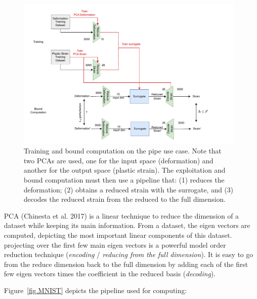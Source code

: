 \begin{figure}[h!]
    \centering
    \includegraphics[scale=0.9]{PIPE.pdf} \hspace{1.5cm}
    \caption{Training and bound computation on the pipe use case. 
    Note that two PCAs are used, one for the input space (deformation) and another for the output space (plastic strain). The exploitation and bound computation must then use a pipeline that: (1) reduces the deformation; (2) obtains a reduced strain with the surrogate, and (3) decodes the reduced strain from the reduced to the full dimension.}
    \label{fig.PIPE}
\end{figure}	


PCA (Chinesta et al. 2017) is a linear technique to reduce the dimension of a dataset while keeping its main information.
From a dataset, the eigen vectors are computed, depicting the most important linear components of this dataset.
projecting over the first few main eigen vectors is a powerful model order reduction technique ({\em encoding} / {\em reducing from the full dimension}). 
It is easy to go from the reduce dimension back to the full dimension
by adding each of the first few eigen vectors times the coefficient in the reduced basis ({\em decoding}).

Figure~\ref{fig.MNIST} depicts the pipeline used for computing:

